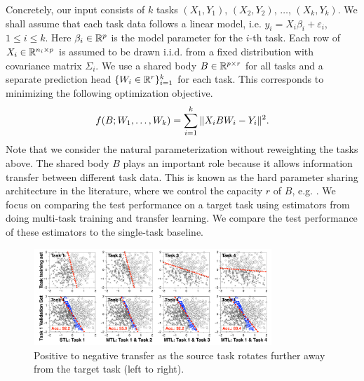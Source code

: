 Concretely, our input consists of $k$ tasks $(X_1, Y_1)$, $(X_2, Y_2)$, $\dots$, $(X_k, Y_k)$.
We shall assume that each task data follows a linear model, i.e. $y_i = X_i \beta_i + \varepsilon_i$, $1\le i\le k$.
Here $\beta_i\in\mathbb{R}^p$ is the model parameter for the $i$-th task.
Each row of $X_i\in\mathbb{R}^{n_i\times p}$ is assumed to be drawn i.i.d. from a fixed distribution with covariance matrix $\Sigma_i$.
We use a shared body $B\in\mathbb{R}^{p\times r}$ for all tasks and a separate prediction head $\{W_i \in \mathbb{R}^{r}\}_{i=1}^k$ for each task.
This corresponds to minimizing the following optimization objective.
\begin{align}
	\label{eq_mtl}
	f(B; W_1, \dots, W_k) = \sum_{i=1}^k \|X_i B W_i - Y_i\|^2.
\end{align}
Note that we consider the natural parameterization without reweighting the tasks above.
The shared body $B$ plays an important role because it allows information transfer between different task data.
This is known as the hard parameter sharing architecture in the literature, where we control the capacity $r$ of $B$, e.g. \cite{KD12,WZR20}.
We focus on comparing the test performance on a target task using estimators from doing multi-task training and transfer learning.
We compare the test performance of these estimators to the single-task baseline.

\begin{figure}[!t]
	\centering
	\includegraphics[width=0.8\textwidth]{figures/model_distance_motivation.pdf}
	\caption{Positive to negative transfer as the source task rotates further away from the target task (left to right).}
	\label{fig_motivation}
\end{figure}



